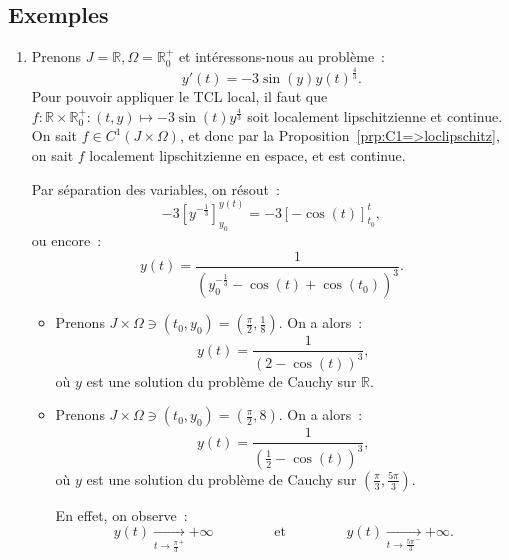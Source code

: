 \documentclass{report}
\theoremstyle{definition}
\theoremstyle{remark}
\numberwithin{equation}{section}
\newcommand{\R}{\mathbb R}
\newcommand{\Rp}{\R^{+}}
\newcommand{\pinfty}{{+\infty}}
\begin{document}
		\subsection{Exemples}
			\begin{enumerate}
				\item Prenons $J = \R, \Omega = \Rp_0$ et intéressons-nous au problème~:
				\begin{equation}
					y'(t) = -3\sin(y)y(t)^{\frac 43}.
				\end{equation}
				Pour pouvoir appliquer le TCL local, il faut que $f : \R \times \Rp_0 : (t, y) \mapsto -3\sin(t)y^{\frac 43}$ soit localement lipschitzienne et
				continue. On sait $f \in C^1(J \times \Omega)$, et donc par la Proposition~\ref{prp:C1=>loclipschitz}, on sait $f$ localement lipschitzienne en
				espace, et est continue.

				Par séparation des variables, on résout~:
				\begin{equation}
					-3\left[y^{-\frac 13}\right]_{y_0}^{y(t)} = -3\left[-\cos(t)\right]_{t_0}^t,
				\end{equation}
				ou encore~:
				\begin{equation}
					y(t) = \frac 1{\left(y_0^{-\frac 13} - \cos(t) + \cos(t_0)\right)^3}.
				\end{equation}

				\begin{itemize}
					\item Prenons $J \times \Omega \ni (t_0, y_0) = \left(\frac \pi2, \frac 18\right)$. On a alors~:
					\begin{equation}
						y(t) = \frac 1{\left(2-\cos(t)\right)^3},
					\end{equation}
					où $y$ est une solution du problème de Cauchy sur $\R$.

					\item Prenons $J \times \Omega \ni (t_0, y_0) = \left(\frac \pi2, 8\right)$. On a alors~:
					\begin{equation}
						y(t) = \frac 1{\left(\frac 12 - \cos(t)\right)^3},
					\end{equation}
					où $y$ est une solution du problème de Cauchy sur $\left(\frac \pi3, \frac {5\pi}3\right)$.

					En effet, on observe~:
					\begin{equation}
						y(t) \xrightarrow[t \to {\frac \pi3}^+]{} \pinfty\qquad\qquad\text{ et }\qquad\qquad y(t) \xrightarrow[t \to {\frac {5\pi}3}^-]{} \pinfty.
					\end{equation}
				\end{itemize}


\end{enumerate}
\end{document}
